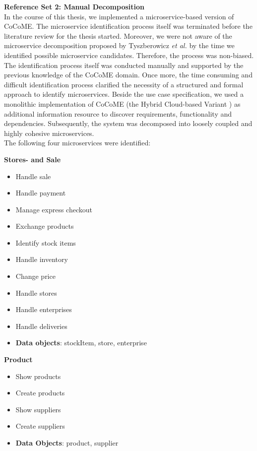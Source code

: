 \noindent
\textbf{Reference Set 2: Manual Decomposition} \\
In the course of this thesis, we implemented a microservice-based version of CoCoME. The microservice identification process itself was terminated before the literature review for the thesis started. Moreover, we were not aware of the microservice decomposition proposed by Tyszberowicz \textit{et al.} \cite{FunctionalDecompositionHeinrich} by the time we identified possible microservice candidates. Therefore, the process was non-biased. \\
The identification process itself was conducted manually and supported by the previous knowledge of the CoCoME domain. Once more, the time consuming and difficult identification process clarified the necessity of a structured and formal approach to identify microservices. Beside the use case specification, we used a monolithic implementation of CoCoME (the Hybrid Cloud-based Variant \cite{CoCoMETechnical}) as additional information resource to discover requirements, functionality and dependencies. Subsequently, the system was decomposed into loosely coupled and highly cohesive microservices. \\
The following four microservices were identified:




\begin{multicols}{2}
	\textbf{Stores- and Sale}
	\begin{flushleft}
		\begin{itemize}[noitemsep]
			\item Handle sale
			\item Handle payment
			\item Manage express checkout
			\item Exchange products
			\item Identify stock items
			\item Handle inventory
			\item Change price
			\item Handle stores
			\item Handle enterprises
			\item Handle deliveries
			\item \textbf{Data objects}: stockItem, store, enterprise
		\end{itemize}
	\end{flushleft}
	
	
	\vfill
	\columnbreak
	\textbf{Product}
	\begin{flushleft}
		\begin{itemize}[noitemsep]
			\item Show products
			\item Create products
			\item Show suppliers
			\item Create suppliers
			\item \textbf{Data Objects}: product, supplier
		
		
		\end{itemize}
	\end{flushleft}

\end{multicols}





